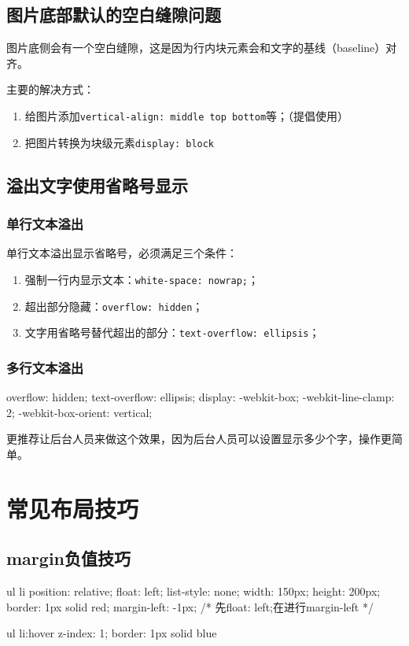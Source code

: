 \subsection{图片底部默认的空白缝隙问题}
图片底侧会有一个空白缝隙，这是因为行内块元素会和文字的基线（baseline）对齐。

主要的解决方式：
\begin{enumerate}
	\item 给图片添加\verb|vertical-align: middle top bottom|等；（提倡使用）
	\item 把图片转换为块级元素\verb|display: block|
\end{enumerate}
\subsection{溢出文字使用省略号显示}
\subsubsection{单行文本溢出}
单行文本溢出显示省略号，必须满足三个条件：
\begin{enumerate}
	\item 强制一行内显示文本：\verb|white-space: nowrap;|；
	\item 超出部分隐藏：\verb|overflow: hidden|；
	\item 文字用省略号替代超出的部分：\verb|text-overflow: ellipsis|；
\end{enumerate}
\subsubsection{多行文本溢出}
\begin{css}
	overflow: hidden;
	text-overflow: ellipsis;
	display: -webkit-box;
	-webkit-line-clamp: 2;
	-webkit-box-orient: vertical;
\end{css}
更推荐让后台人员来做这个效果，因为后台人员可以设置显示多少个字，操作更简单。

\section{常见布局技巧}
\subsection{margin负值技巧}
\begin{css}
	ul li {
			position: relative;
			float: left;
			list-style: none;
			width: 150px;
			height: 200px;
			border: 1px solid red;
			margin-left: -1px;
			/* 先float: left;在进行margin-left */
		}

	ul li:hover {
	z-index: 1;
	border: 1px solid blue
	}
\end{css}
